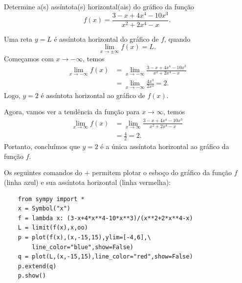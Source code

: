 \begin{exeresol}
  Determine a(s) assíntota(s) horizontal(ais) do gráfico da função
  \begin{equation}
    f(x) = \frac{3 - x + 4x^4 - 10x^3}{x^2 + 2x^4 -x}.
  \end{equation}
\end{exeresol}
\begin{resol}
  Uma reta $y = L$ é assíntota horizontal do gráfico de $f$, quando
  \begin{equation}
    \lim_{x\to\pm\infty} f(x) = L.
  \end{equation}
  Começamos com $x\to-\infty$, temos
  \begin{align}
    \lim_{x\to-\infty} f(x) &= \lim_{x\to-\infty} \frac{3 - x + 4x^4 - 10x^3}{x^2 + 2x^4 -x} \\
                            &= \lim_{x\to -\infty} \frac{4x^4}{2x^4} = 2.
  \end{align}
  Logo, $y=2$ é assíntota horizontal ao gráfico de $f(x)$.

  Agora, vamos ver a tendência da função para $x\to\infty$, temos
  \begin{align}
    \lim_{x\to\infty} f(x) &= \lim_{x\to\infty} \frac{3 - x + 4x^4 - 10x^3}{x^2 + 2x^4 -x}\\
                           &= \frac{4}{2} = 2.
  \end{align}
  Portanto, concluímos que $y=2$ é a única assíntota horizontal ao gráfico da função $f$.

  \ifispython
  Os seguintes comandos do {\python}+{\sympy} permitem plotar o esboço do gráfico da função $f$ (linha azul) e sua assíntota horizontal (linha vermelha):
  \begin{lstlisting}
    from sympy import *
    x = Symbol("x")
    f = lambda x: (3-x+4*x**4-10*x**3)/(x**2+2*x**4-x)
    L = limit(f(x),x,oo)
    p = plot(f(x),(x,-15,15),ylim=[-4,6],\
        line_color="blue",show=False)
    q = plot(L,(x,-15,15),line_color="red",show=False)
    p.extend(q)
    p.show()
  \end{lstlisting}
  \fi
\end{resol}

